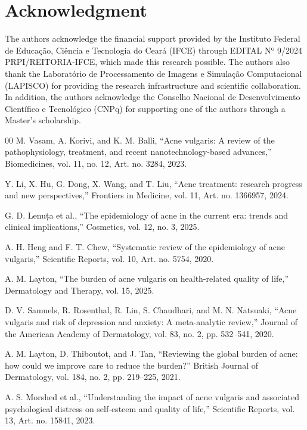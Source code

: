 \documentclass[conference]{IEEEtran}
\begin{document}
\section*{Acknowledgment}
The authors acknowledge the financial support provided by the Instituto Federal de Educação, Ciência e Tecnologia do Ceará (IFCE) through EDITAL Nº 9/2024 PRPI/REITORIA-IFCE, which made this research possible. The authors also thank the Laboratório de Processamento de Imagens e Simulação Computacional (LAPISCO) for providing the research infrastructure and scientific collaboration. In addition, the authors acknowledge the Conselho Nacional de Desenvolvimento Científico e Tecnológico (CNPq) for supporting one of the authors through a Master's scholarship.

\begin{thebibliography}{00}
 M. Vasam, A. Korivi, and K. M. Balli, “Acne vulgaris: A review of the pathophysiology, treatment, and recent nanotechnology-based advances,” Biomedicines, vol. 11, no. 12, Art. no. 3284, 2023.

 Y. Li, X. Hu, G. Dong, X. Wang, and T. Liu, “Acne treatment: research progress and new perspectives,” Frontiers in Medicine, vol. 11, Art. no. 1366957, 2024.

 G. D. Lenuța et al., “The epidemiology of acne in the current era: trends and clinical implications,” Cosmetics, vol. 12, no. 3, 2025.

 A. H. Heng and F. T. Chew, “Systematic review of the epidemiology of acne vulgaris,” Scientific Reports, vol. 10, Art. no. 5754, 2020.

 A. M. Layton, “The burden of acne vulgaris on health-related quality of life,” Dermatology and Therapy, vol. 15, 2025.

 D. V. Samuels, R. Rosenthal, R. Lin, S. Chaudhari, and M. N. Natsuaki, “Acne vulgaris and risk of depression and anxiety: A meta-analytic review,” Journal of the American Academy of Dermatology, vol. 83, no. 2, pp. 532–541, 2020.

 A. M. Layton, D. Thiboutot, and J. Tan, “Reviewing the global burden of acne: how could we improve care to reduce the burden?” British Journal of Dermatology, vol. 184, no. 2, pp. 219–225, 2021.

 A. S. Morshed et al., “Understanding the impact of acne vulgaris and associated psychological distress on self-esteem and quality of life,” Scientific Reports, vol. 13, Art. no. 15841, 2023.


\end{thebibliography}
\end{document}
